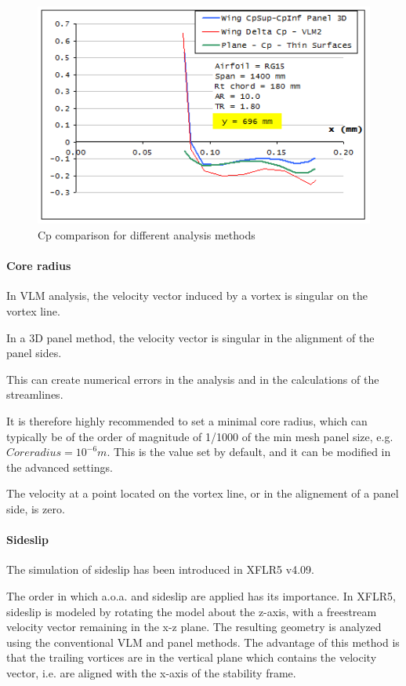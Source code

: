 \documentclass[a4paper,twoside,12pt,dvips]{article}
\begin{document}
\begin{figure}[htbp]
  \includegraphics[width=0.8\linewidth]{img-26}\centering 
  \caption{Cp comparison for different analysis methods}
  \label{fig:cp_comparison_for_different_analysis_methods_2}
\end{figure}

\paragraph{Core radius}

In VLM analysis, the velocity vector induced by a vortex is singular
on the vortex line.

In a 3D panel method, the velocity vector is singular in the alignment
of the panel sides.

This can create numerical errors in the analysis and in the
calculations of the streamlines.

It is therefore highly recommended to set a minimal core radius, which
can typically be of the order of magnitude of 1/1000 of the min mesh
panel size, e.g. $Core radius = 10^{-6}m$. This is the value set by
default, and it can be modified in the advanced settings.

The velocity at a point located on the vortex line, or in the
alignement of a panel side, is zero.

\paragraph{Sideslip}

The simulation of sideslip has been introduced in XFLR5 v4.09.

The order in which a.o.a. and sideslip are applied has its importance.
In XFLR5, sideslip is modeled by rotating the model about the z-axis,
with a freestream velocity vector remaining in the x-z plane. The
resulting geometry is analyzed using the conventional VLM and panel
methods. The advantage of this method is that the trailing vortices
are in the vertical plane which contains the velocity vector, i.e. are
aligned with the x-axis of the stability frame.
\end{document}
